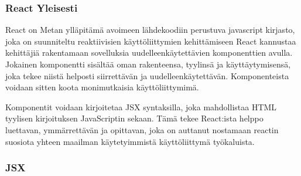 

\subsubsection{React Yleisesti}















React on Metan ylläpitämä avoimeen lähdekoodiin perustuva javascript kirjasto,
joka on suunniteltu reaktiivisien käyttöliittymien kehittämiseen
React kannustaa kehittäjiä rakentamaan sovelluksia uudelleenkäytettävien komponenttien avulla.
Jokainen komponentti sisältää oman rakenteensa, tyylinsä ja käyttäytymisensä, joka tekee niistä helposti siirrettävän ja uudelleenkäytettävän.
Komponenteista voidaan sitten koota monimutkaisia käyttöliittymimä. 
\medskip


Komponentit voidaan kirjoitetaa JSX syntaksilla, joka mahdollistaa HTML tyylisen kirjoituksen JavaScriptin sekaan.
Tämä tekee React:ista helppo luettavan, ymmärrettävän ja opittavan,
joka on auttanut nostamaan reactin suosiota yhteen maailman käytetyimmistä käyttöliittymä työkaluista.
\medskip









\subsubsection{JSX}







